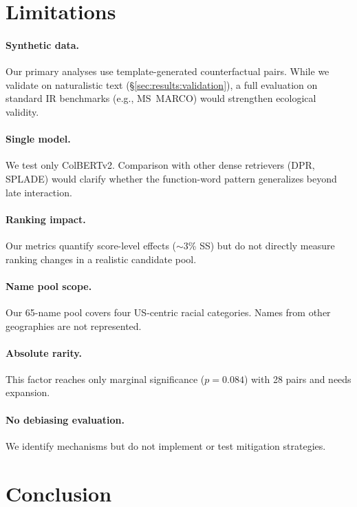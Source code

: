 \documentclass[11pt]{article}
\begin{document}
\section{Limitations}
\label{sec:limitations}

\paragraph{Synthetic data.} Our primary analyses use template-generated counterfactual pairs. While we validate on naturalistic text (\S\ref{sec:results:validation}), a full evaluation on standard IR benchmarks (e.g., MS~MARCO) would strengthen ecological validity.

\paragraph{Single model.} We test only ColBERTv2. Comparison with other dense retrievers (DPR, SPLADE) would clarify whether the function-word pattern generalizes beyond late interaction.

\paragraph{Ranking impact.} Our metrics quantify score-level effects ($\sim$3\% SS) but do not directly measure ranking changes in a realistic candidate pool.

\paragraph{Name pool scope.} Our 65-name pool covers four US-centric racial categories. Names from other geographies are not represented.

\paragraph{Absolute rarity.} This factor reaches only marginal significance ($p = 0.084$) with 28 pairs and needs expansion.

\paragraph{No debiasing evaluation.} We identify mechanisms but do not implement or test mitigation strategies.


\section{Conclusion}
\label{sec:conclusion}
\end{document}
